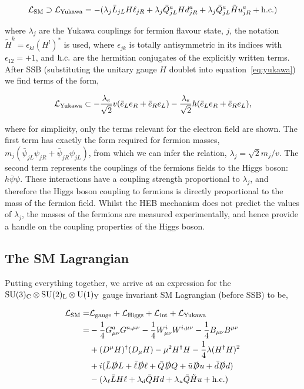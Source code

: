 \begin{equation}\label{eq:yukawa}
    \mathcal{L}_{\rm{SM}} \supset \mathcal{L}_{\rm{Yukawa}} = -(\lambda_j \bar{L}_{jL} H \ell_{jR} + \lambda_j \bar{Q}^a_{jL} H d^a_{jR} + \lambda_j \bar{Q}^a_{jL} \tilde{H} u^a_{jR} + {\rm{h.c.}})
\end{equation}

\noindent
where $\lambda_j$ are the Yukawa couplings for fermion flavour state, $j$, the notation $\tilde{H}^k=\epsilon_{kl}(H^l)^*$ is used, where $\epsilon_{jk}$ is totally antisymmetric in its indices with $\epsilon_{12}=+1$, and ${\rm{h.c.}}$ are the hermitian conjugates of the explicitly written terms. After SSB (substituting the unitary gauge $H$ doublet into equation~\ref{eq:yukawa}) we find terms of the form,

\begin{equation}
   \mathcal{L}_{\rm{Yukawa}} \subset -\frac{\lambda_e}{\sqrt{2}}v(\bar{e}_Le_R+\bar{e}_Re_L)-\frac{\lambda_e}{\sqrt{2}}h(\bar{e}_Le_R+\bar{e}_Re_L),
\end{equation}

\noindent
where for simplicity, only the terms relevant for the electron field are shown. The first term has exactly the form required for fermion masses, $m_{j}(\bar{\psi}_{jL}\psi_{jR}+\bar{\psi}_{jR}\psi_{jL})$, from which we can infer the relation, $\lambda_j = \sqrt{2}m_j/v$. The second term represents the couplings of the fermions fields to the Higgs boson: $h\bar{\psi}\psi$. These interactions have a coupling strength proportional to $\lambda_j$, and therefore the Higgs boson coupling to fermions is directly proportional to the mass of the fermion field. Whilst the HEB mechanism does not predict the values of $\lambda_j$, the masses of the fermions are measured experimentally, and hence provide a handle on the coupling properties of the Higgs boson.

\subsection{The SM Lagrangian}
Putting everything together, we arrive at an expression for the ${\rm{SU}}(3)_{\rm{C}} \otimes {\rm{SU}}(2)_{\rm{L}} \otimes {\rm{U}}(1)_{\rm{Y}}$ gauge invariant SM Lagrangian (before SSB) to be,

\begin{equation}
\begin{split}
    \mathcal{L}_{\rm{SM}} = & \mathcal{L}_{\rm{gauge}} + \mathcal{L}_{\rm{Higgs}} + \mathcal{L}_{\rm{int}} + \mathcal{L}_{\rm{Yukawa}}
    \\
    = &-\frac{1}{4}G^a_{\mu\nu}G^{a,\mu\nu} -\frac{1}{4}W^i_{\mu\nu}W^{i,\mu\nu} -\frac{1}{4}B_{\mu\nu}B^{\mu\nu} 
    \\
    &+ (D^\mu H)^{\dagger}(D_\mu H) - \mu^2H^{\dagger}H - \frac{1}{4}\lambda(H^{\dagger}H)^2
    \\
    &+ i(\bar{L}\slashed{D}L+\bar{\ell}\slashed{D}\ell+\bar{Q}\slashed{D}Q+\bar{u}\slashed{D}u+\bar{d}\slashed{D}d)
    \\
    &- (\lambda_\ell \bar{L} H \ell + \lambda_d \bar{Q} H d + \lambda_u \bar{Q} \tilde{H} u + {\rm{h.c.}})
\end{split}
\end{equation}

